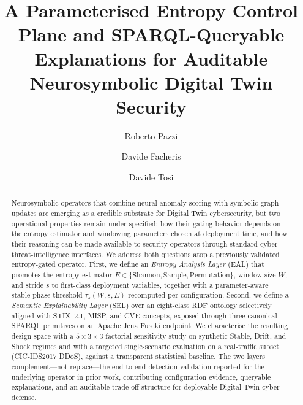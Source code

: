\documentclass[runningheads]{llncs}
\newcommand{\taus}{\ensuremath{\tau_{s}}}
\begin{document}
\title{A Parameterised Entropy Control Plane and SPARQL-Queryable
Explanations for Auditable Neurosymbolic Digital Twin Security}


\author{Roberto Pazzi \and
        Davide Facheris \and
        Davide Tosi}



\maketitle

\begin{abstract}
Neurosymbolic operators that combine neural anomaly scoring with
symbolic graph updates are emerging as a credible substrate for Digital
Twin cybersecurity, but two operational properties remain
under-specified: how their gating behavior depends on the entropy
estimator and windowing parameters chosen at deployment time, and how
their reasoning can be made available to security operators through
standard cyber-threat-intelligence interfaces. We address both questions
atop a previously validated entropy-gated operator. First, we define an
\emph{Entropy Analysis Layer} (EAL) that promotes the entropy estimator
$E \in \{\mathrm{Shannon}, \mathrm{Sample}, \mathrm{Permutation}\}$,
window size $W$, and stride $s$ to first-class deployment variables,
together with a parameter-aware stable-phase threshold
$\taus(W, s, E)$ recomputed per configuration. Second, we define a
\emph{Semantic Explainability Layer} (SEL) over an eight-class RDF
ontology selectively aligned with STIX~2.1, MISP, and CVE concepts,
exposed through three canonical SPARQL primitives on an Apache Jena
Fuseki endpoint. We characterise the resulting design space with a
$5\times 3\times 3$ factorial sensitivity study on synthetic Stable,
Drift, and Shock regimes and with a targeted single-scenario evaluation
on a real-traffic subset (CIC-IDS2017 DDoS), against a transparent
statistical baseline. The two layers complement---not replace---the
end-to-end detection validation reported for the underlying operator in
prior work, contributing configuration evidence, queryable explanations,
and an auditable trade-off structure for deployable Digital Twin
cyber-defense.

\end{abstract}
\end{document}

